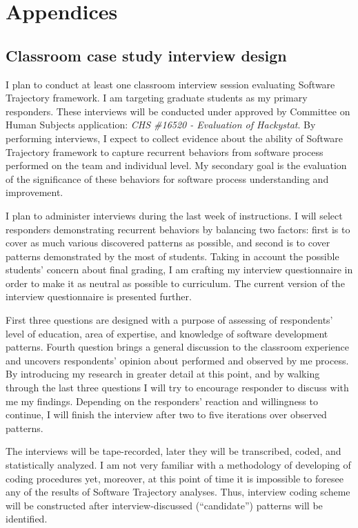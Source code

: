 \chapter{Appendices} \label{appendix}

\section{Classroom case study interview design} \label{survey}
I plan to conduct at least one classroom interview session evaluating Software Trajectory framework. I am targeting graduate students as my primary responders. These interviews will be conducted under approved by Committee on Human Subjects application: \textit{CHS \#16520 - Evaluation of Hackystat}. By performing interviews, I expect to collect evidence about the ability of Software Trajectory framework to capture recurrent behaviors from software process performed on the team and individual level. My secondary goal is the evaluation of the significance of these behaviors for software process understanding and improvement. 

I plan to administer interviews during the last week of instructions. I will select responders demonstrating recurrent behaviors by balancing two factors: first is to cover as much various discovered patterns as possible, and second is to cover patterns demonstrated by the most of students. Taking in account the possible students' concern about final grading, I am crafting my interview questionnaire in order to make it as neutral as possible to curriculum. The current version of the interview questionnaire is presented further. 

First three questions are designed with a purpose of assessing of respondents' level of education, area of expertise, and knowledge of software development patterns. Fourth question brings a general discussion to the classroom experience and uncovers respondents' opinion about performed and observed by me process. By introducing my research in greater detail at this point, and by walking through the last three questions I will try to encourage responder to discuss with me my findings. Depending on the responders' reaction and willingness to continue, I will finish the interview after two to five iterations over observed patterns.

The interviews will be tape-recorded, later they will be transcribed, coded, and statistically analyzed. I am not very familiar with a methodology of developing of coding procedures yet, moreover, at this point of time it is impossible to foresee any of the results of Software Trajectory analyses. Thus, interview coding scheme will be constructed after interview-discussed (``candidate'') patterns will be identified.

